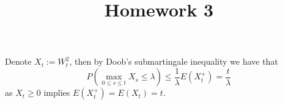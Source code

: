 \documentclass{homework}
\title{Homework 3}
\begin{document}
    \maketitle

    \problem
    Denote $X_t:=W_t^2$, then by Doob's submartingale inequality
    we have that
    \[P\left(\max_{0\leq s\leq t}X_s\leq\lambda\right)
    \leq\frac{1}{\lambda}E(X_t^+)=\frac{t}{\lambda}\]
    as $X_t\geq 0$ implies $E(X_t^+)=E(X_t)=t$.
\end{document}
